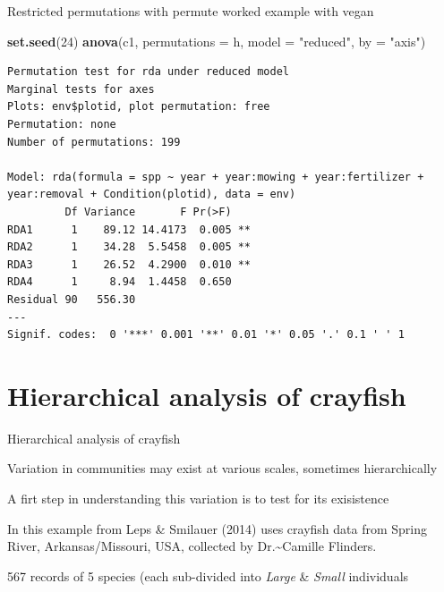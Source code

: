 \documentclass[10pt,ignorenonframetext,compress, aspectratio=169]{beamer}
\newenvironment{Shaded}{\begin{snugshade}}{\end{snugshade}}
\newcommand{\KeywordTok}[1]{\textcolor[rgb]{0.13,0.29,0.53}{\textbf{{#1}}}}
\newcommand{\DataTypeTok}[1]{\textcolor[rgb]{0.13,0.29,0.53}{{#1}}}
\newcommand{\DecValTok}[1]{\textcolor[rgb]{0.00,0.00,0.81}{{#1}}}
\newcommand{\StringTok}[1]{\textcolor[rgb]{0.31,0.60,0.02}{{#1}}}
\newcommand{\NormalTok}[1]{{#1}}
\begin{document}
\begin{frame}[fragile]{Restricted permutations with permute \textbar{}
worked example with vegan}

\scriptsize

\begin{Shaded}
\begin{Highlighting}[]
\KeywordTok{set.seed}\NormalTok{(}\DecValTok{24}\NormalTok{)}
\KeywordTok{anova}\NormalTok{(c1, }\DataTypeTok{permutations =} \NormalTok{h, }\DataTypeTok{model =} \StringTok{"reduced"}\NormalTok{, }\DataTypeTok{by =} \StringTok{"axis"}\NormalTok{)}
\end{Highlighting}
\end{Shaded}

\begin{verbatim}
Permutation test for rda under reduced model
Marginal tests for axes
Plots: env$plotid, plot permutation: free
Permutation: none
Number of permutations: 199

Model: rda(formula = spp ~ year + year:mowing + year:fertilizer + year:removal + Condition(plotid), data = env)
         Df Variance       F Pr(>F)   
RDA1      1    89.12 14.4173  0.005 **
RDA2      1    34.28  5.5458  0.005 **
RDA3      1    26.52  4.2900  0.010 **
RDA4      1     8.94  1.4458  0.650   
Residual 90   556.30                  
---
Signif. codes:  0 '***' 0.001 '**' 0.01 '*' 0.05 '.' 0.1 ' ' 1
\end{verbatim}

\normalsize

\end{frame}

\section{Hierarchical analysis of
crayfish}\label{hierarchical-analysis-of-crayfish}

\begin{frame}{Hierarchical analysis of crayfish}

Variation in communities may exist at various scales, sometimes
hierarchically

A firt step in understanding this variation is to test for its
exisistence

In this example from Leps \& Smilauer (2014) uses crayfish data from
Spring River, Arkansas/Missouri, USA, collected by
Dr.\textasciitilde{}Camille Flinders.

567 records of 5 species (each sub-divided into \emph{Large} \&
\emph{Small} individuals

\end{frame}
\end{document}
